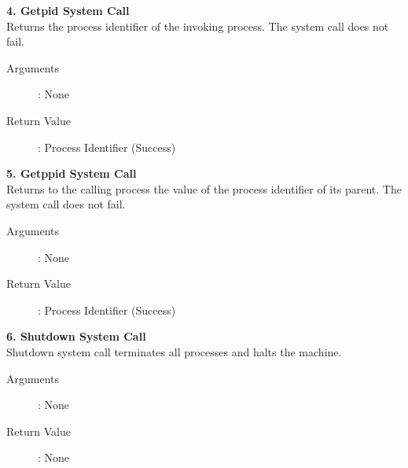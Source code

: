 \documentclass[11pt ,twosided]{article}
\begin{document}
\vspace{16mm}
\fi
\textbf{4. Getpid System Call}\\
 Returns the process identifier of the invoking process. The system call does not fail.
\begin{description}
\item[Arguments]: None
\item[Return Value]: Process Identifier (Success) 
\end{description} 

\textbf{5. Getppid System Call}\\
 Returns to the calling process the value of the process identifier of its parent. The system call does not fail.
\begin{description}
\item[Arguments]: None
\item[Return Value]: Process Identifier (Success) 
\end{description} 

\textbf{6. Shutdown System Call}
\\
Shutdown system call terminates all processes and halts the machine. \begin{description}
\item[Arguments]: None
\item[Return Value]: None
\end{description} 

\end{document}
